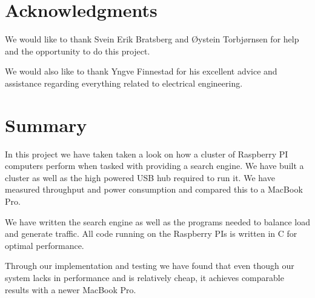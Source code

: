 \clearpage
\section{Acknowledgments}
We would like to thank Svein Erik Bratsberg and \O ystein Torbj\o rnsen for help and the opportunity to do this project.

We would also like to thank Yngve Finnestad for his excellent advice and assistance regarding everything related to electrical engineering.

\section{Summary}
In this project we have taken taken a look on how a cluster of Raspberry PI computers perform when tasked with providing a search engine. We have built a cluster as well as the high powered USB hub required to run it. We have measured throughput and power consumption and compared this to a MacBook Pro.

We have written the search engine as well as the programs needed to balance load and generate traffic. All code running on the Raspberry PIs is written in C for optimal performance.

Through our implementation and testing we have found that even though our system lacks in performance and is relatively cheap, it achieves comparable results with a newer MacBook Pro. 


